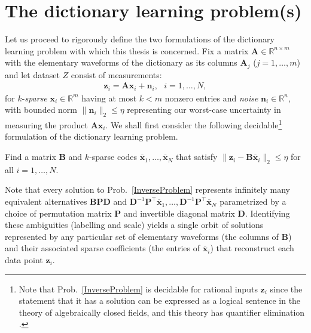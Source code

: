\section{The dictionary learning problem(s)}

Let us proceed to rigorously define the two formulations of the dictionary learning problem with which this thesis is concerned. Fix a matrix $\mathbf{A} \in \mathbb R^{n \times m}$ with the elementary waveforms of the dictionary as its columns  $\mathbf{A}_j$ ($j = 1,\ldots,m$) and let dataset $Z$ consist of measurements:
\begin{align}\label{LinearModel}
\mathbf{z}_i = \mathbf{A}\mathbf{x}_i + \mathbf{n}_i,\ \ \  \text{$i=1,\ldots,N$},
\end{align}
for $k$-\emph{sparse} $\mathbf{x}_i \in \mathbb{R}^m$ having at most $k<m$ nonzero entries and \emph{noise} $\mathbf{n}_i \in \mathbb{R}^n$, with bounded norm $\| \mathbf{n}_i \|_2 \leq  \eta$ representing our worst-case uncertainty in measuring the product $\mathbf{A}\mathbf{x}_i$. We shall first consider the following decidable\footnote{Note that Prob.~\ref{InverseProblem} is decidable for rational inputs $\mathbf{z}_i$ \cite{chrishillar} since the statement that it has a solution can be expressed as a logical sentence in the theory of algebraically closed fields, and this theory has quantifier elimination \cite{basu2006algorithms}.} formulation of the dictionary learning problem.

\begin{problem}\label{InverseProblem}
Find a matrix $\mathbf{B}$ and $k$-sparse codes $\mathbf{\overline x}_1, \ldots, \mathbf{\overline x}_N$ that satisfy $\|\mathbf{z}_i - \mathbf{B}\mathbf{\overline x}_i\|_2 \leq \eta$ for all $i = 1,\ldots,N$.
\end{problem}

Note that every solution to Prob.~\ref{InverseProblem} represents infinitely many equivalent alternatives $\mathbf{BPD}$ and $\mathbf{D}^{-1}\mathbf{P}^{\top}\mathbf{\overline x}_1, \ldots, \mathbf{D}^{-1}\mathbf{P}^{\top}\mathbf{\overline x}_N$ parametrized by a choice of permutation matrix $\mathbf{P}$ and invertible diagonal matrix $\mathbf{D}$. 
Identifying these ambiguities (labelling and scale) yields a single orbit of solutions represented by any particular set of elementary waveforms (the columns of $\mathbf{B}$) and their associated sparse coefficients (the entries of $\mathbf{\overline x}_i$) that reconstruct each data point $\mathbf{z}_i$. 


